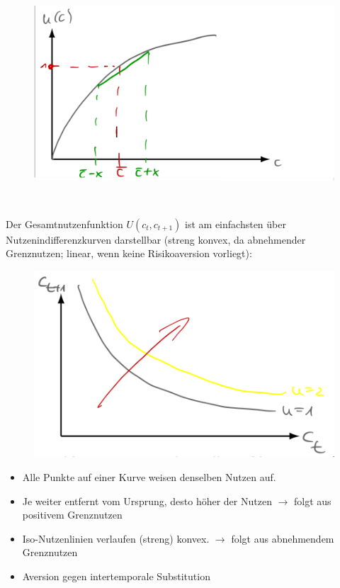 \documentclass[12pt]{extreport} %
\theoremstyle{named}
\theoremstyle{nnamed}
\theoremstyle{itshape}
\theoremstyle{normal}
\begin{document}
\begin{figure}[h!] \centering
	\includegraphics[scale=0.2725]{img/p18}
\end{figure}

~\newpage

Der Gesamtnutzenfunktion $U(c_t, c_{t+1})$ ist am einfachsten über Nutzenindifferenzkurven darstellbar (streng konvex, da abnehmender Grenznutzen; linear, wenn keine Risikoaversion vorliegt): 
\begin{figure}[h!] \centering
	\includegraphics[scale=0.4]{img/p19}
\end{figure}

\begin{itemize}
	\item Alle Punkte auf einer Kurve weisen denselben Nutzen auf.
	\item Je weiter entfernt vom Ursprung, desto höher der Nutzen $\rightarrow$ folgt aus positivem Grenznutzen
	\item Iso-Nutzenlinien verlaufen (streng) konvex. $\rightarrow$ folgt aus abnehmendem Grenznutzen
	\item Aversion gegen intertemporale Substitution
\end{itemize}
~\newpage
\end{document}
